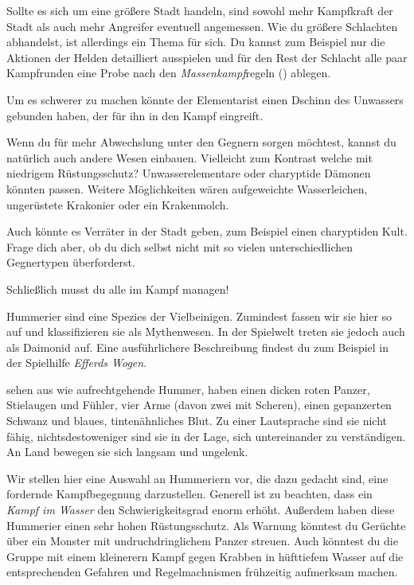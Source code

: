 Sollte es sich um eine größere Stadt handeln, sind sowohl mehr Kampfkraft der Stadt als auch mehr Angreifer eventuell angemessen.
Wie du größere Schlachten abhandelst, ist allerdings ein Thema für sich.
Du kannst zum Beispiel nur die Aktionen der Helden detailliert ausspielen und für den Rest der Schlacht alle paar Kampfrunden eine Probe nach den \textit{Massenkampf}regeln () ablegen. 


Um es schwerer zu machen könnte der Elementarist einen Dschinn des Unwassers gebunden haben, der für ihn in den Kampf eingreift. 

Wenn du für mehr Abwechslung unter den Gegnern sorgen möchtest, kannst du natürlich auch andere Wesen einbauen. Vielleicht zum Kontrast welche mit niedrigem Rüstungsschutz? Unwasserelementare oder charyptide Dämonen könnten passen. Weitere Möglichkeiten wären aufgeweichte Wasserleichen, ungerüstete Krakonier oder ein Krakenmolch.

Auch könnte es Verräter in der Stadt geben, zum Beispiel einen charyptiden Kult. Frage dich aber, ob du dich selbst nicht mit so vielen unterschiedlichen Gegnertypen überforderst.

Schließlich musst du alle im Kampf managen!

\newpage

Hummerier sind eine Spezies der Vielbeinigen. Zumindest fassen wir sie hier so auf und klassifizieren sie als Mythenwesen. In der Spielwelt treten sie jedoch auch als Daimonid auf. Eine ausführlichere Beschreibung findest du zum Beispiel in der Spielhilfe \textit{Efferds Wogen}.

 sehen aus wie aufrechtgehende Hummer, haben einen dicken roten Panzer, Stielaugen und Fühler, vier Arme (davon zwei mit Scheren), einen gepanzerten Schwanz und blaues, tintenähnliches Blut.
Zu einer Lautsprache sind sie nicht fähig, nichtsdestoweniger sind sie in der Lage, sich untereinander zu verständigen. An Land bewegen sie sich langsam und ungelenk.

Wir stellen hier eine Auswahl an Hummeriern vor, die dazu gedacht sind, eine fordernde Kampfbegegnung darzustellen. Generell ist zu beachten, dass ein \textit{Kampf im Wasser} den Schwierigkeitsgrad enorm erhöht. Außerdem haben diese Hummerier einen sehr hohen Rüstungsschutz. Als Warnung könntest du Gerüchte über ein Monster mit undruchdringlichem Panzer streuen. Auch könntest du die Gruppe mit einem kleinerern Kampf gegen Krabben in hüfttiefem Wasser auf die entsprechenden Gefahren und Regelmachnismen frühzeitig aufmerksam machen.

